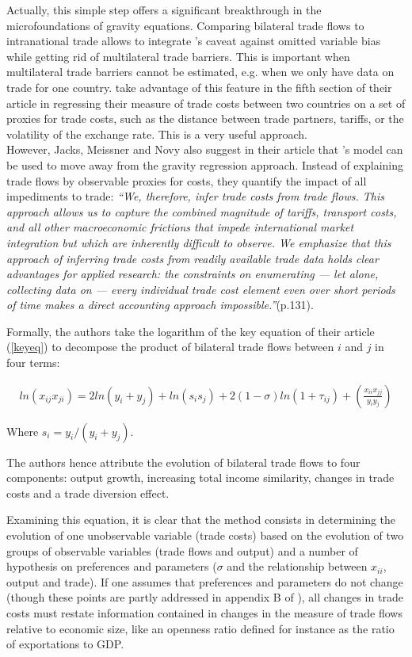 \documentclass{article}
\begin{document}
Actually, this simple step offers a significant breakthrough in the microfoundations of gravity equations. 
Comparing bilateral trade flows to intranational trade allows to integrate \cite{AW2003}'s caveat against omitted variable bias while getting rid of multilateral trade barriers.
This is important when multilateral trade barriers cannot be estimated, e.g. when we only have data on trade for one country. \cite{JMN2011} take advantage of this feature in the fifth section of their article in regressing their measure of trade costs between two countries on a set of proxies for trade costs, such as the distance between trade partners, tariffs, or the volatility of the exchange rate. This is a very useful approach.\\

However, Jacks, Meissner and Novy also suggest in their article that \cite{AW2003}'s model can be used to move away from the gravity regression approach. Instead of explaining trade flows by observable proxies for costs, they quantify the impact of all impediments to trade:
\emph{``We, therefore, infer trade costs from trade flows.
This approach allows us to capture the combined magnitude of tariffs, transport costs, and all other macroeconomic frictions that impede international market integration but which are inherently difficult to observe.
We emphasize that this approach of inferring trade costs from readily available trade data holds clear advantages for applied research: the constraints on enumerating — let alone, collecting data on — every individual trade cost element even over short periods of time makes a direct accounting approach impossible.''}(p.131).

Formally, the authors take the logarithm of the key equation of their article (\ref{keyeq}) to decompose the product of bilateral trade flows between $i$ and $j$ in four terms:

\begin{eqnarray}
ln (x_{ij}x_{ji})= 2 ln(y_i + y_j)+ ln (s_i s_j) + 2(1-\sigma)ln(1+\tau_{ij})+ \left(\frac{x_{ii} x_{jj}}{y_i y_j}\right)
\end{eqnarray}

Where $s_i=y_i/(y_i+y_j)$.

The authors hence attribute the evolution of bilateral trade flows to four components: output growth, increasing total income similarity, changes in trade costs and a trade diversion effect.

Examining this equation, it is clear that the method consists in determining the evolution of one unobservable variable (trade costs) based on the evolution of two groups of observable variables (trade flows and output) and a number of hypothesis on preferences and parameters ($\sigma$ and the relationship between $x_{ii}$, output and trade). If one assumes that preferences and parameters do not change (though these points are partly addressed  in appendix B of  \cite{JMN2011}), all changes in trade costs must restate information contained in changes in the measure of trade flows relative to economic size, like an openness ratio defined for instance as the ratio of exportations to GDP. 
\end{document}
